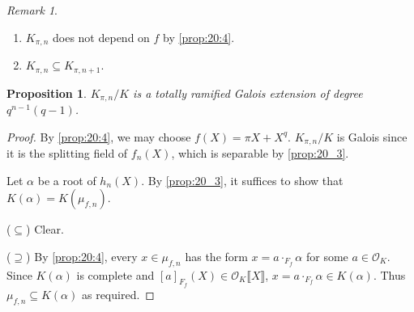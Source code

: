 \documentclass[11pt]{article}
\theoremstyle{definition}
\theoremstyle{plain}
\newtheorem{proposition}[definition]{Proposition}
\theoremstyle{remark}
\newtheorem*{remark}{Remark}
\newcommand{\cO}{\mathcal{O}}
\begin{document}
\begin{remark}\phantom{}
    \begin{enumerate}
        \item $K_{\pi,n}$ does not depend on $f$ by \autoref{prop:20:4}.
        \item $K_{\pi, n} \subseteq K_{\pi, n+1}$.
    \end{enumerate}
\end{remark}

\begin{proposition}\label{prop:20_6}
    $K_{\pi,n} / K$ is a totally ramified Galois extension of degree $q^{n-1} (q-1)$.
\end{proposition}
\begin{proof}
    By \autoref{prop:20:4}, we may choose $f(X) = \pi X + X^q$. $K_{\pi,n}/K$ is Galois since it is the splitting field of $f_n(X)$, which is separable by \autoref{prop:20_3}.

    Let $\alpha$ be a root of $h_n(X)$. By \autoref{prop:20_3}, it suffices to show that $K(\alpha) = K(\mu_{f,n})$.

    \noindent ($\subseteq$) Clear.

    \noindent ($\supseteq$) By \autoref{prop:20:4}, every $x \in \mu_{f,n}$ has the form $x = a \cdot_{F_f} \alpha$ for some $a \in \cO_K$. Since $K(\alpha)$ is complete and $[a]_{F_f}(X) \in \cO_K \llbracket X \rrbracket$, $x = a \cdot_{F_f} \alpha \in K(\alpha)$. Thus $\mu_{f, n} \subseteq K(\alpha)$ as required.
\end{proof}
\end{document}
